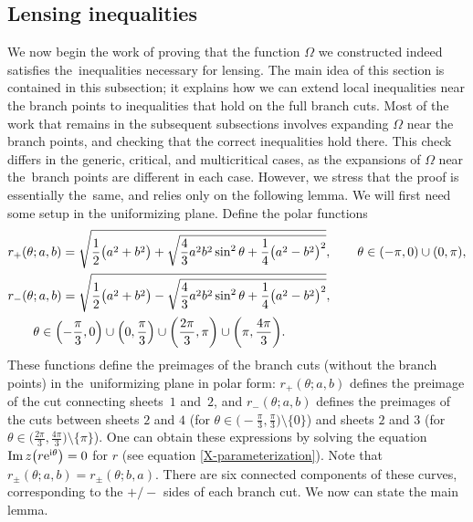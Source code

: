\documentclass[pdftex]{sigma}
\numberwithin{equation}{section}
\begin{document}
\subsection{Lensing inequalities}\label{ssec:SecondTransformation}
We now begin the work of proving that the function $\Omega$ we constructed indeed satisfies the~inequalities necessary for lensing. The main idea of this
section is contained in this subsection; it explains how we can extend local inequalities near the branch points to inequalities that hold on the full
branch cuts. Most of the work that remains in the subsequent subsections involves expanding $\Omega$ near the branch points, and checking that the correct
inequalities hold there.
This check differs in the generic, critical, and multicritical cases, as the expansions of $\Omega$ near the~branch points
are different in each case. However, we stress that the proof is essentially the~same, and relies only on the following lemma. We will first need some setup
in the uniformizing plane. Define the polar functions
 \begin{align*}
 &r_+(\theta;a,b)= \sqrt{\frac{1}{2}\bigl(a^2+b^2\bigr) + \sqrt{\frac{4}{3} a^2b^2 \sin^2\theta + \frac{1}{4}\bigl(a^2-b^2\bigr)^2}}, \qquad \theta \in (-\pi,0)\cup (0,\pi),\\
 &r_-(\theta;a,b)= \sqrt{\frac{1}{2}\bigl(a^2+b^2\bigr) - \sqrt{\frac{4}{3} a^2b^2 \sin^2\theta + \frac{1}{4}\bigl(a^2-b^2\bigr)^2}},\\
 &\qquad\theta\in \Bigl(-\frac{\pi}{3}, 0\Bigr)\cup\Bigl(0,\frac{\pi}{3}\Bigr) \cup \biggl(\frac{2\pi}{3},\pi\biggr)\cup \biggl(\pi,\frac{4\pi}{3}\biggr) \nonumber.
 \end{align*}
 These functions define the preimages of the branch cuts (without the branch points) in the~uniformizing plane in polar form: $r_+(\theta;a,b)$ defines the
 preimage of the cut connecting sheets~$1$ and~$2$, and $r_-(\theta;a,b)$ defines the preimages of the cuts between sheets $2$ and $4$ \big(for $\theta\in\bigl(-\frac{\pi}{3},\frac{\pi}{3}\bigr)\setminus\{0\}$\big) and sheets $2$ and $3$ \big(for $\theta\in \bigl(\frac{2\pi}{3},\frac{4\pi}{3}\bigr) \setminus\{\pi\}$\big). One can obtain these expressions by solving the equation
 $\operatorname{Im} z \bigl(r{\rm e}^{{\rm i}\theta}\bigr) = 0$ for $r$ (see equation \eqref{X-parameterization}). Note that $r_{\pm}(\theta;a,b) = r_{\pm}(\theta;b,a)$.
 There are six connected components of these curves, corresponding to the $+/-$ sides of each branch cut. We now can state the main lemma.
\end{document}
